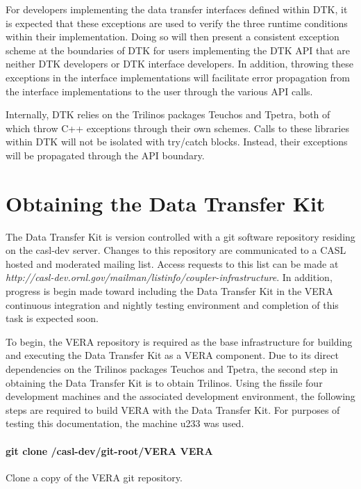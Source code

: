 \documentclass[letterpaper]{article}
\begin{document}
For developers implementing the data transfer interfaces defined
within DTK, it is expected that these exceptions are used to verify
the three runtime conditions within their implementation. Doing so
will then present a consistent exception scheme at the boundaries of
DTK  for users implementing the DTK API that are neither DTK
developers or DTK interface developers. In addition, throwing these
exceptions in the interface implementations will facilitate error
propagation from the interface implementations to the user through the
various API calls. 

Internally, DTK relies on the Trilinos packages Teuchos and Tpetra,
both of which throw C++ exceptions through their own schemes. Calls to
these libraries within DTK will not be isolated with try/catch
blocks. Instead, their exceptions will be propagated through the API
boundary.

\section{Obtaining the Data Transfer Kit}
The Data Transfer Kit is version controlled with a git software
repository residing on the casl-dev server. Changes to this repository
are communicated to a CASL hosted and moderated mailing list. Access
requests to this list can be made at
{\sl http://casl-dev.ornl.gov/mailman/listinfo/coupler-infrastructure}. In 
addition, progress is begin made toward including the Data Transfer Kit
in the VERA continuous integration and nightly testing environment and
completion of this task is expected soon.

To begin, the VERA repository is required as the base infrastructure
for building and executing the Data Transfer Kit as a VERA
component. Due to its direct dependencies on the Trilinos packages
Teuchos and Tpetra, the second step in obtaining the Data Transfer Kit
is to obtain Trilinos. Using the fissile four development machines and
the associated development environment, the following steps are
required to build VERA with the Data Transfer Kit. For purposes of
testing this documentation, the machine u233 was used.

\paragraph{git clone /casl-dev/git-root/VERA VERA}
Clone a copy of the VERA git repository.
\end{document}
